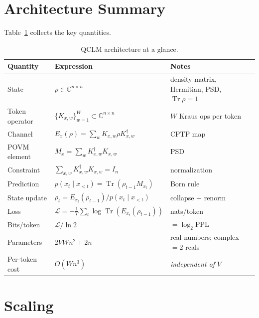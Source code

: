 \documentclass[11pt,a4paper]{article}
\newcommand{\Tr}{\operatorname{Tr}}
\newcommand{\CC}{\mathbb{C}}
\newcommand{\Kx}[2]{K_{#1,#2}}     %
\newcommand{\Ex}[1]{E_{#1}}         %
\newcommand{\Mx}[1]{M_{#1}}         %
\theoremstyle{plain}
\begin{document}
\section{Architecture Summary}

Table~\ref{tab:arch} collects the key quantities.

\begin{table}[h]
\centering
\caption{QCLM architecture at a glance.}
\label{tab:arch}
\begin{tabular}{@{}lll@{}}
\toprule
\textbf{Quantity} & \textbf{Expression} & \textbf{Notes} \\
\midrule
State              & $\rho\in\CC^{n\times n}$ & density matrix, Hermitian, PSD, $\Tr\rho=1$ \\
Token operator     & $\{\Kx{x}{w}\}_{w=1}^W\subset\CC^{n\times n}$ & $W$ Kraus ops per token \\
Channel            & $\Ex{x}(\rho)=\sum_w\Kx{x}{w}\rho\Kx{x}{w}^\dagger$ & CPTP map \\
POVM element       & $\Mx{x}=\sum_w\Kx{x}{w}^\dagger\Kx{x}{w}$ & PSD \\
Constraint         & $\sum_{x,w}\Kx{x}{w}^\dagger\Kx{x}{w}=I_n$ & normalization \\
Prediction         & $p(x_t\mid x_{<t})=\Tr(\rho_{t-1}\Mx{x_t})$ & Born rule \\
State update       & $\rho_t = \Ex{x_t}(\rho_{t-1})/p(x_t\mid x_{<t})$ & collapse + renorm \\
Loss               & $\mathcal{L}=-\frac{1}{T}\sum_t\log\Tr(\Ex{x_t}(\rho_{t-1}))$ & nats/token \\
Bits/token         & $\mathcal{L}/\ln 2$ & $=\log_2\mathrm{PPL}$ \\
Parameters         & $2VWn^2 + 2n$ & real numbers; complex $= 2$ reals \\
Per-token cost     & $O(Wn^3)$ & \emph{independent of} $V$ \\
\bottomrule
\end{tabular}
\end{table}

\section{Scaling}
\end{document}
